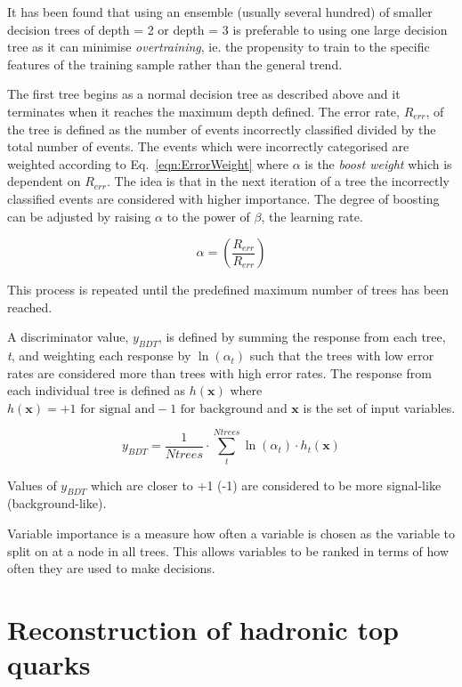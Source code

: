 It has been found that using an ensemble (usually several hundred) of smaller decision trees of depth = 2 or depth = 3 is preferable to using one large decision tree as it can minimise \emph{overtraining}, ie. the propensity to train to the specific features of the training sample rather than the general trend. 

The first tree begins as a normal decision tree as described above and it terminates when it reaches the maximum depth defined. The error rate, $R_{err}$, of the tree is defined as the number of events incorrectly classified divided by the total number of events. The events which were incorrectly categorised are weighted according to Eq.~\ref{eqn:ErrorWeight} where $\alpha$ is the \emph{boost weight} which is dependent on $R_{err}$. The idea is that in the next iteration of a tree the incorrectly classified events are considered with higher importance. The degree of boosting can be adjusted by raising $\alpha$ to the power of $\beta$, the learning rate.

\begin{equation}
\alpha = \left( \frac{R_{err}}{R_{err}}  \right)
\label{eqn:ErrorWeight}
\end{equation}

This process is repeated until the predefined maximum number of trees has been reached. 

A discriminator value, $y_{BDT}$, is defined by summing the response from each tree, \emph{t}, and weighting each response by $\ln \left(\alpha_{t}\right)$ such that the trees with low error rates are considered more than trees with high error rates. The response from each individual tree is defined as $h\left(\textbf{x}\right)$ where $h\left(\textbf{x}\right) = +1 \textrm{ for signal and} -1 \textrm{ for background}$ and $\textbf{x}$ is the set of input variables. 

\begin{equation}
y_{BDT} = \frac{1}{Ntrees} \cdot \sum_{t}^{Ntrees} \ln \left(\alpha_{t}\right) \cdot h_{t}\left(\textbf{x}\right)
\end{equation}

Values of $y_{BDT}$ which are closer to +1 (-1) are considered to be more signal-like (background-like).

Variable importance is a measure how often a variable is chosen as the variable to split on at a node in all trees. This allows variables to be ranked in terms of how often they are used to make decisions.

\section{Reconstruction of hadronic top quarks \label{sec:topreco}}

